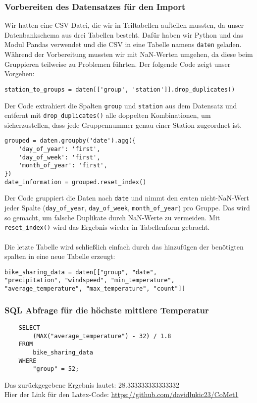 \documentclass{article}
\begin{document}
\subsubsection{Vorbereiten des Datensatzes für den Import}
Wir hatten eine CSV-Datei, die wir in Teiltabellen aufteilen mussten, da unser Datenbankschema aus drei Tabellen besteht. Dafür haben wir Python und das Modul Pandas verwendet und die CSV in eine Tabelle namens \texttt{daten} geladen. Während der Vorbereitung mussten wir mit NaN-Werten umgehen, da diese beim Gruppieren teilweise zu Problemen führten. Der folgende Code zeigt unser Vorgehen:
\begin{lstlisting}
station_to_groups = daten[['group', 'station']].drop_duplicates()
\end{lstlisting}
Der Code extrahiert die Spalten \texttt{group} und \texttt{station} aus dem Datensatz und entfernt mit \texttt{drop\_duplicates()} alle doppelten Kombinationen, um sicherzustellen, dass jede Gruppennummer genau einer Station zugeordnet ist.
\begin{lstlisting}
grouped = daten.groupby('date').agg({
    'day_of_year': 'first',
    'day_of_week': 'first',
    'month_of_year': 'first',
})
date_information = grouped.reset_index()
\end{lstlisting}
Der Code gruppiert die Daten nach \texttt{date} und nimmt den ersten nicht-NaN-Wert jeder Spalte (\texttt{day\_of\_year}, \texttt{day\_of\_week}, \texttt{month\_of\_year}) pro Gruppe. Das wird so gemacht, um falsche Duplikate durch NaN-Werte zu vermeiden. Mit \texttt{reset\_index()} wird das Ergebnis wieder in Tabellenform gebracht.\\\\
Die letzte Tabelle wird schließlich einfach durch das hinzufügen der benötigten spalten in eine neue Tabelle erzeugt:
\begin{lstlisting}
bike_sharing_data = daten[["group", "date",
"precipitation", "windspeed", "min_temperature",
"average_temperature", "max_temperature", "count"]]
\end{lstlisting}

\subsubsection{SQL Abfrage für die höchste mittlere Temperatur}
\begin{verbatim}
    SELECT 
        (MAX("average_temperature") - 32) / 1.8
    FROM 
        bike_sharing_data
    WHERE 
        "group" = 52;
\end{verbatim}
Das zurückgegebene Ergebnis lautet: 28.333333333333332\\
Hier der Link für den Latex-Code:  \href{https://github.com/davidlukic23/CoMet1}{https://github.com/davidlukic23/CoMet1}
\newpage


\end{document}
